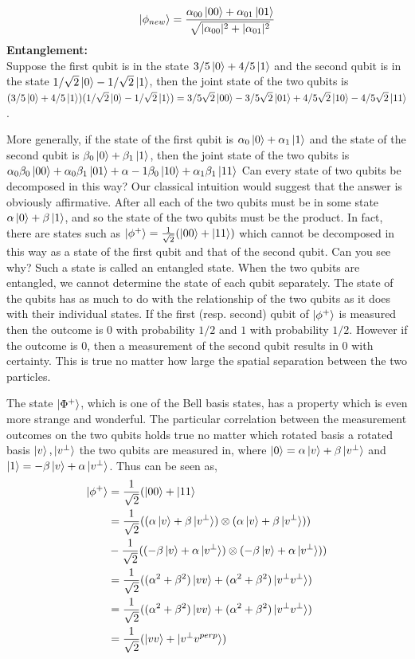 \[
\ket{\phi_{new}}=\frac{\alpha_{00}\ket{00}+\alpha_{01}\ket{01}}{\sqrt{|\alpha_{00}|^2+|\alpha_{01}|^2}}
\]
\textbf{Entanglement: }\\
Suppose the first qubit is in the state $3/5\ket{0}+4/5\ket{1}$ and the second qubit is in the state $1/\sqrt{2} \ket{0}-1/\sqrt{2}\ket{1}$, then the joint state of the two qubits is $(3/5\ket{0}+4/5\ket{1})(1/\sqrt{2}\ket{0}-1/\sqrt{2}\ket{1})=3/5\sqrt{2}\ket{00}-3/5\sqrt{2}\ket{01}+4/5\sqrt{2}\ket{10}-4/5\sqrt{2}\ket{11}$.

More generally, if the state of the first qubit is $\alpha_0\ket{0}+\alpha_1\ket{1}$ and the state of the second qubit is $\beta_0\ket{0}+\beta_1\ket{1}$, then the joint state of the two qubits is $\alpha_{0}\beta_0\ket{00}+\alpha_0\beta_1\ket{01}+\alpha-1\beta_0\ket{10}+\alpha_1\beta_1\ket{11}$ Can every state of two qubits be decomposed in this way? Our classical intuition would suggest that the answer is obviously affirmative. After all each of the two qubits must be in some state $\alpha\ket{0}+\beta\ket{1}$, and so the state of the two qubits must be the product. In fact, there are states such as $\ket{\phi^{+}}=\frac{1}{\sqrt{2}}(\ket{00}+\ket{11})$ which cannot be decomposed in this way as a state of the first qubit and that of the second qubit. Can you see why? Such a state is called an entangled state. When the two qubits are entangled, we cannot determine the state of each qubit separately. The state of the qubits has as much to do with the relationship of the two qubits as it does with their individual states. If the first (resp. second) qubit of $\ket{\phi^{+}}$ is measured then the outcome is $0$ with probability $1/2$ and $1$ with probability $1/2$. However if the outcome is $0$, then a measurement of the second qubit results in $0$ with certainty. This is true no matter how large the spatial separation between the two particles. 

The state $\ket{\Phi^{+}}$, which is one of the Bell basis states, has a property which is even more strange and wonderful. The particular correlation between the measurement outcomes on the two qubits holds true no matter which rotated basis a rotated basis $\ket{v}, \ket{v^{\perp}}$ the two qubits are measured in, where $\ket{0}=\alpha\ket{v}+\beta\ket{v^{\perp}}$ and $\ket{1}=-\beta\ket{v}+\alpha\ket{v^{\perp}}$. Thus can be seen as,
\begin{align*}
    \ket{\phi^{+}}&=\frac{1}{\sqrt{2}}(\ket{00}+\ket{11}\\
    &=\frac{1}{\sqrt{2}} ((\alpha\ket{v}+\beta\ket{v^{\perp}}) \otimes (\alpha\ket{v}+\beta\ket{v^{\perp}}))\\
    &-\frac{1}{\sqrt{2}}((-\beta\ket{v}+\alpha\ket{v^{\perp}})\otimes (-\beta\ket{v}+\alpha\ket{v^{\perp}}))\\
    &=\frac{1}{\sqrt{2}}((\alpha^2+\beta^2)\ket{vv}+(\alpha^2+\beta^2)\ket{v^{\perp}v^{\perp}})\\
    &=\frac{1}{\sqrt{2}}((\alpha^2+\beta^2)\ket{vv}+(\alpha^2+\beta^2)\ket{v^{\perp}v^{\perp}})\\
    &=\frac{1}{\sqrt{2}}(\ket{vv}+\ket{v^{\perp}v^{perp}})
\end{align*}

